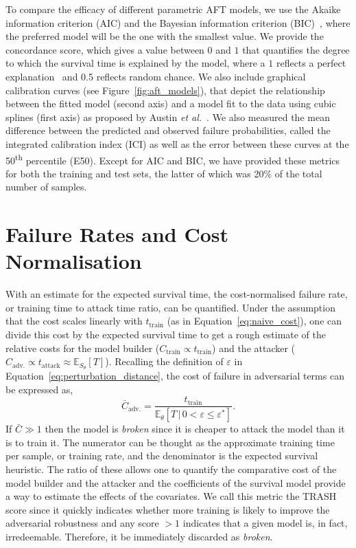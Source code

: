 To compare the efficacy of different parametric AFT models, we use the Akaike information criterion (AIC) and the Bayesian information criterion (BIC)~\cite{stoica2004model,taddy2019business}, where the preferred model will be the one with the smallest value. We provide the
concordance score, which gives a value between $0$ and $1$ that quantifies the degree to which the survival time is explained by the model, where a $1$ reflects a perfect explanation~\cite{kleinbaum1996survival} and 0.5 reflects random chance. We also include graphical calibration curves (see Figure~\ref{fig:aft_models}), that depict the relationship between the fitted model (second axis) and a model fit to the data using cubic splines (first axis) as proposed by Austin \textit{et al.}~\cite{ici}. We also measured the mean difference between the predicted and observed failure probabilities,  called the integrated calibration index (ICI) as well as the error between these curves at the 50\textsuperscript{th} percentile (E50). Except for AIC and BIC, we have provided these metrics for both the training and test sets, the latter of which was 20\% of the total number of samples.

\section{Failure Rates and Cost Normalisation}
\label{cost_normalization}

With an estimate for the expected survival time, the cost-normalised failure rate, or training time to attack time ratio, can be quantified. Under the assumption that the cost scales linearly with $t_{\mathrm{train}}$ (as in Equation~\ref{eq:naive_cost}), one can divide this cost by the expected survival time to get a rough estimate of the relative costs for the model builder ($C_{\mathrm{train}} \propto t_{\mathrm{train}}$) and the attacker ($C_{\mathrm{adv.}} \propto t_{\mathrm{attack}} \approx \mathbb{E}_{S_\theta}[T]$). Recalling the definition of $\varepsilon$ in Equation~\ref{eq:perturbation_distance}, the cost of failure in adversarial terms can be expressed as,
\begin{equation}
	\bar{C}_{\mathrm{adv.}}=\frac{t_{\mathrm{train}}}{\mathbb{E}_{\theta}[T \,|\, 0 < \varepsilon \leq \varepsilon^*]}.
	\label{eq:cost}
\end{equation}
If $\bar{C} \gg 1$  then the model is \textit{broken} since it is cheaper to attack the model than it is to train it.
The numerator can be thought as the approximate training time per sample, or training rate, and the denominator is the expected survival heuristic.
The ratio of these allows one to quantify the comparative cost of the model builder and the attacker and the coefficients of the survival model provide a way to estimate the effects of the covariates.
We call this metric the TRASH score since it quickly indicates whether more training is likely to improve the adversarial robustness and any score $ > 1$ indicates that a given model is, in fact, irredeemable.
Therefore, it be immediately discarded as \textit{broken}.


